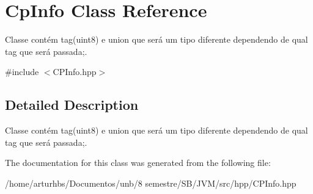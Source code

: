\hypertarget{classCpInfo}{}\section{Cp\+Info Class Reference}
\label{classCpInfo}


Classe contém tag(uint8) e union que será um tipo diferente dependendo de qual tag que será passada;.  




{\ttfamily \#include $<$C\+P\+Info.\+hpp$>$}



\subsection{Detailed Description}
Classe contém tag(uint8) e union que será um tipo diferente dependendo de qual tag que será passada;. 

The documentation for this class was generated from the following file\+:\begin{DoxyCompactItemize}
\item 
/home/arturhbs/\+Documentos/unb/8 semestre/\+S\+B/\+J\+V\+M/src/hpp/C\+P\+Info.\+hpp\end{DoxyCompactItemize}
